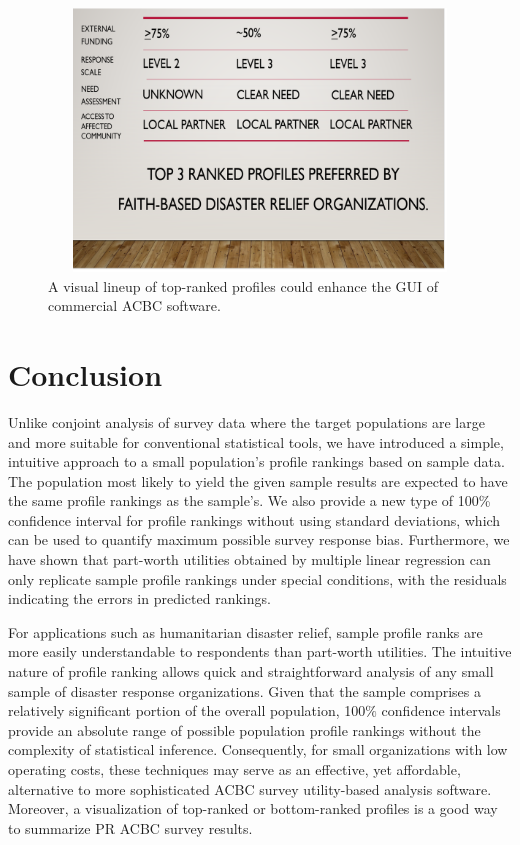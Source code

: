 \documentclass[a4paper, 12pt]{article}
\begin{document}
\begin{figure}[!htpb]
\centering
\includegraphics[width=5.75in, height=2.75in]{Fig6.png}
\caption{A visual lineup of top-ranked profiles could enhance the GUI of commercial ACBC software.}
\label{fig:6}
\end{figure}





\section{Conclusion}
Unlike conjoint analysis of survey data where the target populations are large and more suitable for conventional statistical tools, we have introduced a simple, intuitive approach to a small population's profile rankings based on sample data. The population most likely to yield the given sample results are expected to have the same profile rankings as the sample's. We also provide a new type of 100\% confidence interval for profile rankings without using standard deviations, which can be used to quantify maximum possible survey response bias. Furthermore, we have shown that part-worth utilities obtained by multiple linear regression can only replicate sample profile rankings under special conditions, with the residuals indicating the errors in predicted rankings. 

For applications such as humanitarian disaster relief, sample profile ranks are more easily understandable to respondents than part-worth utilities. The intuitive nature of profile ranking allows quick and straightforward analysis of any small sample of disaster response organizations. Given that the sample  comprises a relatively significant portion of the overall population, 100$\%$ confidence intervals provide an absolute range of possible population profile rankings without the complexity of statistical inference. Consequently, for small organizations with low operating costs, these techniques may serve as an effective, yet affordable, alternative to more sophisticated ACBC survey utility-based analysis software. Moreover, a visualization of top-ranked or bottom-ranked profiles is a good way to summarize PR ACBC survey results.
\end{document}
